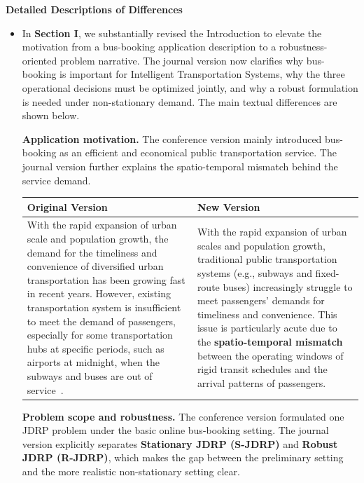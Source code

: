 \documentclass[11pt, a4paper]{article}
\begin{document}
\newpage
 
\noindent \textbf{Detailed Descriptions of Differences}

\begin{itemize}
    \item[a)] In \textbf{Section I}, we substantially revised the Introduction to elevate the motivation from a bus-booking application description to a robustness-oriented problem narrative. The journal version now clarifies why bus-booking is important for Intelligent Transportation Systems, why the three operational decisions must be optimized jointly, and why a robust formulation is needed under non-stationary demand. The main textual differences are shown below.

    \textbf{Application motivation.} The conference version mainly introduced bus-booking as an efficient and economical public transportation service. The journal version further explains the spatio-temporal mismatch behind the service demand.

    \begin{tabular}{|p{}|p{}|}
        \hline
        \textbf{Original Version} & \textbf{New Version}\\
        \hline
        With the rapid expansion of urban scale and population growth, the demand for the timeliness and convenience of diversified urban transportation has been growing fast in recent years. However, existing transportation system is insufficient to meet the demand of passengers, especially for some transportation hubs at specific periods, such as airports at midnight, when the subways and buses are out of service~\cite{ref:odrp}. &
        With the rapid expansion of urban scales and population growth, traditional public transportation systems (e.g., subways and fixed-route buses) increasingly struggle to meet passengers' demands for timeliness and convenience. This issue is particularly acute due to the \textbf{spatio-temporal mismatch} between the operating windows of rigid transit schedules and the arrival patterns of passengers.\\
        \hline
    \end{tabular}

    \textbf{Problem scope and robustness.} The conference version formulated one JDRP problem under the basic online bus-booking setting. The journal version explicitly separates \textbf{Stationary JDRP (S-JDRP)} and \textbf{Robust JDRP (R-JDRP)}, which makes the gap between the preliminary setting and the more realistic non-stationary setting clear.


\end{itemize}
\end{document}
